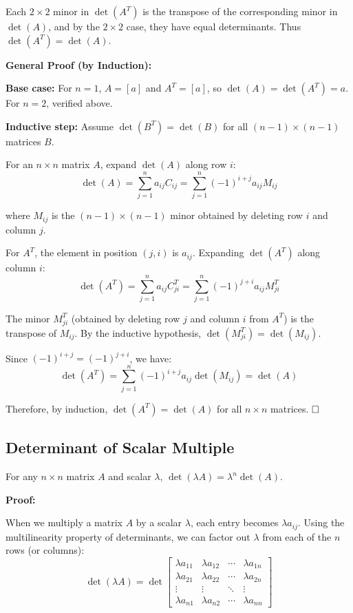 Each $2 \times 2$ minor in $\det(A^T)$ is the transpose of the corresponding minor in $\det(A)$, and by the $2 \times 2$ case, they have equal determinants. Thus $\det(A^T) = \det(A)$.

\vspace{0.5em}

\textbf{General Proof (by Induction):}

\textbf{Base case:} For $n=1$, $A = [a]$ and $A^T = [a]$, so $\det(A) = \det(A^T) = a$. For $n=2$, verified above.

\textbf{Inductive step:} Assume $\det(B^T) = \det(B)$ for all $(n-1) \times (n-1)$ matrices $B$.

For an $n \times n$ matrix $A$, expand $\det(A)$ along row $i$:
$$\det(A) = \sum_{j=1}^{n} a_{ij} C_{ij} = \sum_{j=1}^{n} (-1)^{i+j} a_{ij} M_{ij}$$

where $M_{ij}$ is the $(n-1) \times (n-1)$ minor obtained by deleting row $i$ and column $j$.

For $A^T$, the element in position $(j,i)$ is $a_{ij}$. Expanding $\det(A^T)$ along column $i$:
$$\det(A^T) = \sum_{j=1}^{n} a_{ij} C^T_{ji} = \sum_{j=1}^{n} (-1)^{j+i} a_{ij} M^T_{ji}$$

The minor $M^T_{ji}$ (obtained by deleting row $j$ and column $i$ from $A^T$) is the transpose of $M_{ij}$. By the inductive hypothesis, $\det(M^T_{ji}) = \det(M_{ij})$.

Since $(-1)^{i+j} = (-1)^{j+i}$, we have:
$$\det(A^T) = \sum_{j=1}^{n} (-1)^{i+j} a_{ij} \det(M_{ij}) = \det(A)$$

Therefore, by induction, $\det(A^T) = \det(A)$ for all $n \times n$ matrices. $\hfill \square$

\subsection{Determinant of Scalar Multiple}
\label{appendix:det-scalar}

\begin{tcolorbox}[colback=white,colframe=black,title=Theorem]
For any $n \times n$ matrix $A$ and scalar $\lambda$, $\det(\lambda A) = \lambda^n \det(A)$.
\end{tcolorbox}

\textbf{Proof:}

When we multiply a matrix $A$ by a scalar $\lambda$, each entry becomes $\lambda a_{ij}$. Using the multilinearity property of determinants, we can factor out $\lambda$ from each of the $n$ rows (or columns):
$$\det(\lambda A) = \det\begin{bmatrix} \lambda a_{11} & \lambda a_{12} & \cdots & \lambda a_{1n} \\ \lambda a_{21} & \lambda a_{22} & \cdots & \lambda a_{2n} \\ \vdots & \vdots & \ddots & \vdots \\ \lambda a_{n1} & \lambda a_{n2} & \cdots & \lambda a_{nn} \end{bmatrix}$$

